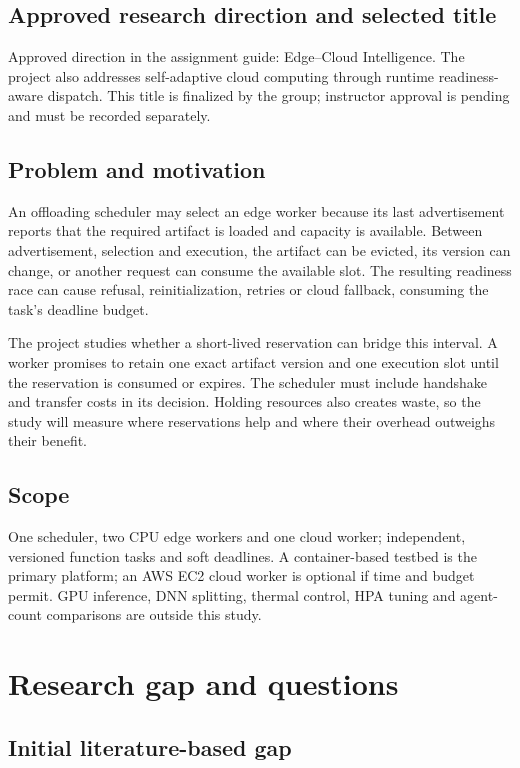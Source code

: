 \documentclass[11pt,a4paper]{article}
\begin{document}
\subsection{Approved research direction and selected title}

Approved direction in the assignment guide: Edge--Cloud Intelligence. The project also addresses self-adaptive cloud computing through runtime readiness-aware dispatch. This title is finalized by the group; instructor approval is pending and must be recorded separately.

\subsection{Problem and motivation}

An offloading scheduler may select an edge worker because its last advertisement reports that the required artifact is loaded and capacity is available. Between advertisement, selection and execution, the artifact can be evicted, its version can change, or another request can consume the available slot. The resulting readiness race can cause refusal, reinitialization, retries or cloud fallback, consuming the task's deadline budget.

The project studies whether a short-lived reservation can bridge this interval. A worker promises to retain one exact artifact version and one execution slot until the reservation is consumed or expires. The scheduler must include handshake and transfer costs in its decision. Holding resources also creates waste, so the study will measure where reservations help and where their overhead outweighs their benefit.

\subsection{Scope}

One scheduler, two CPU edge workers and one cloud worker; independent, versioned function tasks and soft deadlines. A container-based testbed is the primary platform; an AWS EC2 cloud worker is optional if time and budget permit. GPU inference, DNN splitting, thermal control, HPA tuning and agent-count comparisons are outside this study.

\section{Research gap and questions}

\subsection{Initial literature-based gap}
\end{document}
